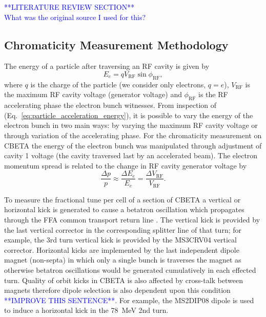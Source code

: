 \documentclass[../main.tex]{subfiles}
\begin{document}
\textcolor{blue}{**LITERATURE REVIEW SECTION** \\ What was the original source I used for this? }

\subsection{Chromaticity Measurement Methodology}
\label{sec:chromaticity_measurement_methodology}

The energy of a particle after traversing an RF cavity is given by
\begin{equation}
E_{e} = qV_{\mathrm{RF}}\sin\phi_{\mathrm{RF}},
\label{eq:particle_acceleration_energy}
\end{equation}
where $q$ is the charge of the particle (we consider only electrons, $q=e$), $V_{\mathrm{RF}}$ is the maximum RF cavity voltage (generator voltage) and $\phi_{\mathrm{RF}}$ is the RF accelerating phase the electron bunch witnesses. From inspection of (Eq.~\ref{eq:particle_acceleration_energy}), it is possible to vary the energy of the electron bunch in two main ways: by varying the maximum RF cavity voltage or through variation of the accelerating phase. For the chromaticity measurement on CBETA the energy of the electron bunch was manipulated through adjustment of cavity 1 voltage (the cavity traversed last by an accelerated beam). The electron momentum spread is related to the change in RF cavity generator voltage by
\begin{equation}
\frac{\Delta p}{p}\approx \frac{\Delta E_{e}}{E_{e}} = \frac{\Delta V_{\mathrm{RF}}}{V_{\mathrm{RF}}}.    
\end{equation}

To measure the fractional tune per cell of a section of CBETA a vertical or horizontal kick is generated to cause a betatron oscillation which propagates through the FFA common transport return line \cite{gulliford2021measurement}. The vertical kick is provided by the last vertical corrector in the corresponding splitter line of that turn; for example, the 3rd turn vertical kick is provided by the MS3CRV04 vertical corrector. Horizontal kicks are implemented by the last independent dipole magnet (non-septa) in which only a single bunch is traverses the magnet as otherwise betatron oscillations would be generated cumulatively in each effected turn. Quality of orbit kicks in CBETA is also affected by cross-talk between magnets therefore dipole selection is also dependent upon this condition \textcolor{blue}{**IMPROVE THIS SENTENCE**}. For example, the MS2DIP08 dipole is used to induce a horizontal kick in the 78~\si{\mega\electronvolt} 2nd turn.
\end{document}
